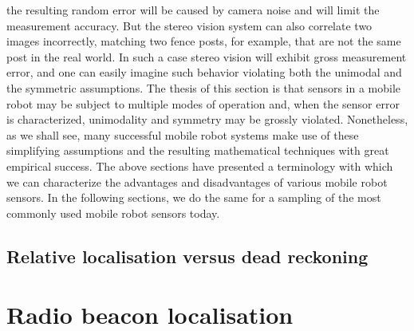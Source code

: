 the resulting random error will be caused by camera noise and will limit the measurement
accuracy. But the stereo vision system can also correlate two images incorrectly, matching
two fence posts, for example, that are not the same post in the real world. In such a case
stereo vision will exhibit gross measurement error, and one can easily imagine such behavior 
violating both the unimodal and the symmetric assumptions.
The thesis of this section is that sensors in a mobile robot may be subject to multiple
modes of operation and, when the sensor error is characterized, unimodality and symmetry
may be grossly violated. Nonetheless, as we shall see, many successful mobile robot systems 
make use of these simplifying assumptions and the resulting mathematical techniques
with great empirical success.
The above sections have presented a terminology with which we can characterize the
advantages and disadvantages of various mobile robot sensors. In the following sections,
we do the same for a sampling of the most commonly used mobile robot sensors today.

\subsection{Relative localisation versus dead reckoning}

\section{Radio beacon localisation}


